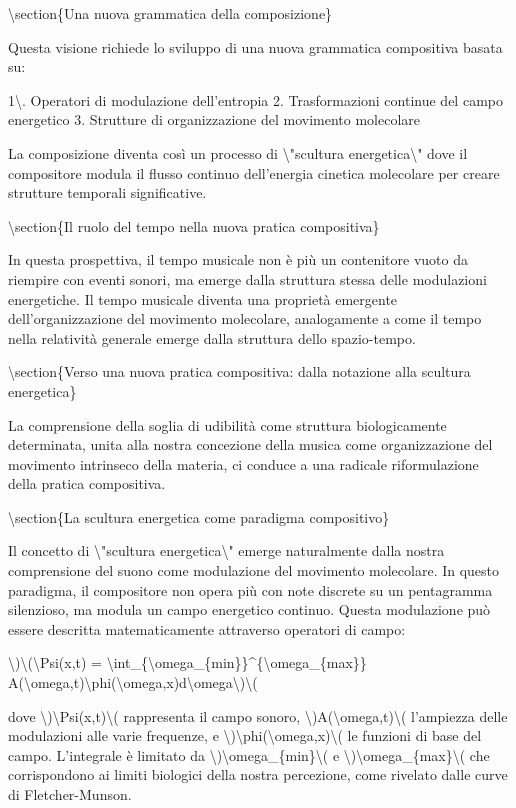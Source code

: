 \documentclass[a4paper,11pt]{article}
\begin{document}
\textbackslash{}section\{Una nuova grammatica della composizione\}

Questa visione richiede lo sviluppo di una nuova grammatica compositiva
basata su:

1\textbackslash{}. Operatori di modulazione dell'entropia 2. Trasformazioni continue
del campo energetico 3. Strutture di organizzazione del movimento
molecolare

La composizione diventa cos\`i un processo di \textbackslash{}"scultura energetica\textbackslash{}" dove
il compositore modula il flusso continuo dell'energia cinetica
molecolare per creare strutture temporali significative.

\textbackslash{}section\{Il ruolo del tempo nella nuova pratica compositiva\}

In questa prospettiva, il tempo musicale non \`e pi\`u un contenitore vuoto
da riempire con eventi sonori, ma emerge dalla struttura stessa delle
modulazioni energetiche. Il tempo musicale diventa una propriet\`a
emergente dell'organizzazione del movimento molecolare, analogamente a
come il tempo nella relativit\`a generale emerge dalla struttura dello
spazio-tempo.

\textbackslash{}section\{Verso una nuova pratica compositiva: dalla notazione alla scultura energetica\}

La comprensione della soglia di udibilit\`a come struttura biologicamente
determinata, unita alla nostra concezione della musica come
organizzazione del movimento intrinseco della materia, ci conduce a una
radicale riformulazione della pratica compositiva.

\textbackslash{}section\{La scultura energetica come paradigma compositivo\}

Il concetto di \textbackslash{}"scultura energetica\textbackslash{}" emerge naturalmente dalla nostra
comprensione del suono come modulazione del movimento molecolare. In
questo paradigma, il compositore non opera pi\`u con note discrete su un
pentagramma silenzioso, ma modula un campo energetico continuo. Questa
modulazione pu\`o essere descritta matematicamente attraverso operatori di
campo:

\textbackslash{})\textbackslash{}(\textbackslash{}Psi(x,t) = \textbackslash{}int\_\{\textbackslash{}omega\_\{min\}\}\textasciicircum{}\{\textbackslash{}omega\_\{max\}\} A(\textbackslash{}omega,t)\textbackslash{}phi(\textbackslash{}omega,x)d\textbackslash{}omega\textbackslash{})\textbackslash{}(

dove \textbackslash{})\textbackslash{}Psi(x,t)\textbackslash{}( rappresenta il campo sonoro, \textbackslash{})A(\textbackslash{}omega,t)\textbackslash{}( l'ampiezza
delle modulazioni alle varie frequenze, e \textbackslash{})\textbackslash{}phi(\textbackslash{}omega,x)\textbackslash{}( le funzioni
di base del campo. L'integrale \`e limitato da \textbackslash{})\textbackslash{}omega\_\{min\}\textbackslash{}( e
\textbackslash{})\textbackslash{}omega\_\{max\}\textbackslash{}( che corrispondono ai limiti biologici della nostra
percezione, come rivelato dalle curve di Fletcher-Munson.
\end{document}
